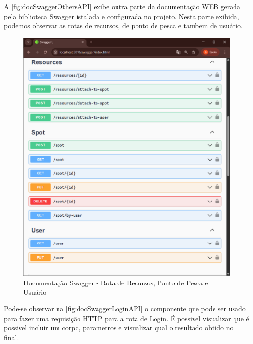 A \autoref{fig:docSwaggerOthersAPI} exibe outra parte da documentação WEB gerada pela biblioteca Swagger istalada e configurada no projeto. Nesta parte exibida, podemos observar as rotas de recursos, de ponto de pesca e tambem de usuário.

\begin{figure}[H]
    \centering
    \caption{Documentação Swagger - Rota de Recursos, Ponto de Pesca e Usuário}
    \label{fig:docSwaggerOthersAPI}
    \includegraphics[scale=0.60]{./dados/figuras/swagger-api-others.png}
\end{figure}

\newpage

Pode-se observar na \autoref{fig:docSwaggerLoginAPI} o componente que pode ser usado para fazer uma requisição HTTP para a rota de Login. É possivel visualizar que é possivel incluir um corpo, parametros e visualizar qual o resultado obtido no final.

